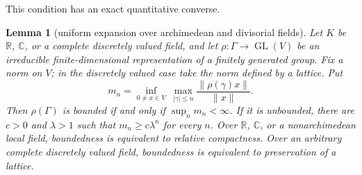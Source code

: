 \documentclass[11pt,reqno]{amsart}
\newtheorem{lemma}[theorem]{Lemma}
\theoremstyle{definition}
\theoremstyle{remark}
\newcommand{\R}{\mathbb R}
\newcommand{\C}{\mathbb C}
\newcommand{\GL}{\operatorname{GL}}
\begin{document}
This condition has an exact quantitative converse.

\begin{lemma}[uniform expansion over archimedean and divisorial fields]
\label{lem:projective-escape}
Let \(K\) be \(\R\), \(\C\), or a complete discretely valued field, and let
\(\rho:\Gamma\to\GL(V)\) be an irreducible finite-dimensional
representation of a finitely generated group.  Fix a norm on \(V\); in the
discretely valued case take the norm defined by a lattice.  Put
\[
 m_n=\inf_{0\ne x\in V}\ \max_{|\gamma|\le n}
       \frac{\|\rho(\gamma)x\|}{\|x\|}.
\]
Then \(\rho(\Gamma)\) is bounded if and only if
\(\sup_nm_n<\infty\).  If it is unbounded, there are
\(c>0\) and \(\lambda>1\) such that \(m_n\ge c\lambda^n\) for every \(n\).
Over \(\R\), \(\C\), or a nonarchimedean local field, boundedness is
equivalent to relative compactness.  Over an arbitrary complete discretely
valued field, boundedness is equivalent to preservation of a lattice.
\end{lemma}
\end{document}
